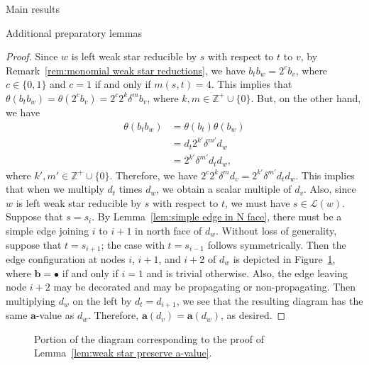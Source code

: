 \documentclass[11pt]{amsart}
\theoremstyle{definition}
\numberwithin{equation}{section}
\newcommand{\Z}{\mathbb{Z}}
\newcommand{\x}{\mathsf{x}}
\renewcommand{\a}{\mathbf{a}}
\newcommand{\bcirc}{\bullet}
\renewcommand{\L}{\mathcal{L}}
\renewcommand{\(}{\left(}
\renewcommand{\)}{\right)}
\begin{document}
\begin{section}{Main results}
\begin{subsection}{Additional preparatory lemmas}
\begin{proof}
Since $w$ is left weak star reducible by $s$ with respect to $t$ to $v$, by Remark~\ref{rem:monomial weak star reductions}, we have $b_{t}b_{w}=2^{c}b_{v}$, where $c \in \{0,1\}$ and $c=1$ if and only if $m(s,t)=4$.  This implies that $\theta(b_{t}b_{w})=\theta(2^{c}b_{v})=2^{c}2^{k}\delta^{m}b_{v}$, where $k,m \in \Z^{+}\cup\{0\}$.  But, on the other hand, we have
{\allowdisplaybreaks
\begin{align*}
\theta(b_{t}b_{w})&=\theta(b_{t})\theta(b_{w})\\
&=d_{t}2^{k'}\delta^{m'}d_{w}\\
&=2^{k'}\delta^{m'}d_{t}d_{w},
\end{align*}}%
where $k',m' \in \Z^{+}\cup\{0\}$.  Therefore, we have $2^{c}2^{k}\delta^{m}d_{v}=2^{k'}\delta^{m'}d_{t}d_{w}$.  This implies that when we multiply $d_{t}$ times $d_{w}$, we obtain a scalar multiple of $d_{v}$.  Also, since $w$ is left weak star reducible by $s$ with respect to $t$, we must have $s \in \L(w)$.  Suppose that $s=s_{i}$.  By Lemma~\ref{lem:simple edge in N face}, there must be a simple edge joining $i$ to $i+1$ in north face of $d_{w}$. Without loss of generality, suppose that $t=s_{i+1}$; the case with $t=s_{i-1}$ follows symmetrically.  Then the edge configuration at nodes $i$, $i+1$, and $i+2$ of $d_{w}$ is depicted in Figure~\ref{fig:weak star preserve a-value}, where $\mathbf{b}=\bcirc$ if and only if $i=1$ and is trivial otherwise.  Also, the edge leaving node $i+2$ may be decorated and may be propagating or non-propagating.  Then multiplying $d_{w}$ on the left by $d_{t}=d_{i+1}$, we see that the resulting diagram has the same $\a$-value as $d_{w}$.  Therefore, $\a(d_{v})=\a(d_{w})$, as desired.
\end{proof}

\begin{figure}[!ht]
\caption{Portion of the diagram corresponding to the proof of Lemma~\ref{lem:weak star preserve a-value}.}\label{fig:weak star preserve a-value}
\end{figure}


\end{subsection}
\end{section}
\end{document}
